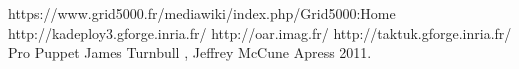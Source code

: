 \documentclass[a4paper, 10pt, onecolumn]{report}
\begin{document}
\begin{thebibliography}{99}
 https://www.grid5000.fr/mediawiki/index.php/Grid5000:Home
 http://kadeploy3.gforge.inria.fr/
 http://oar.imag.fr/
 http://taktuk.gforge.inria.fr/
        Pro Puppet
		James Turnbull , Jeffrey McCune 
        Apress
        2011.


          
\end{thebibliography}
\end{document}
